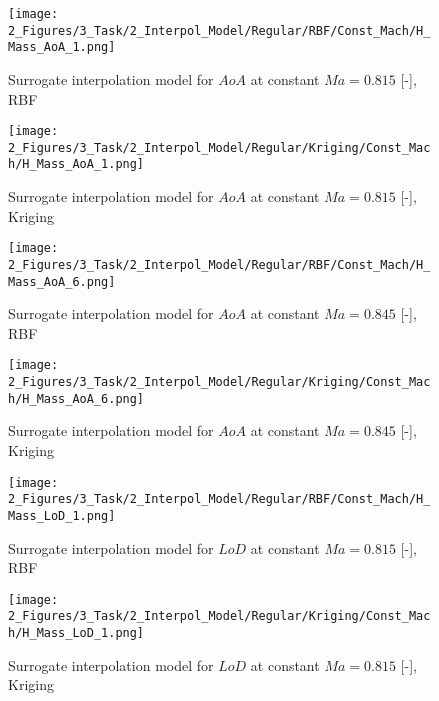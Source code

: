 \begin{figure}[!h]
    \begin{minipage}[h]{0.46\textwidth}
        \centering
        \texttt{[image: 2\_Figures/3\_Task/2\_Interpol\_Model/Regular/RBF/Const\_Mach/H\_Mass\_AoA\_1.png]}
        \caption{Surrogate interpolation model for $AoA$ at constant $Ma = 0.815$ [-], RBF}
        \label{fig_68}    
    \end{minipage}
    \hfill
    \begin{minipage}{0.46\textwidth}
        \centering
        \texttt{[image: 2\_Figures/3\_Task/2\_Interpol\_Model/Regular/Kriging/Const\_Mach/H\_Mass\_AoA\_1.png]}
        \caption{Surrogate interpolation model for $AoA$ at constant $Ma = 0.815$ [-], Kriging}
        \label{fig_69}    
    \end{minipage}
\end{figure} 

\begin{figure}[!h]
    \begin{minipage}[h]{0.46\textwidth}
        \centering
        \texttt{[image: 2\_Figures/3\_Task/2\_Interpol\_Model/Regular/RBF/Const\_Mach/H\_Mass\_AoA\_6.png]}
        \caption{Surrogate interpolation model for $AoA$ at constant $Ma = 0.845$ [-], RBF}
        \label{fig_70}    
    \end{minipage}
    \hfill
    \begin{minipage}{0.46\textwidth}
        \centering
        \texttt{[image: 2\_Figures/3\_Task/2\_Interpol\_Model/Regular/Kriging/Const\_Mach/H\_Mass\_AoA\_6.png]}
        \caption{Surrogate interpolation model for $AoA$ at constant $Ma = 0.845$ [-], Kriging}
        \label{fig_71}    
    \end{minipage}
\end{figure} 



\begin{figure}[!h]
    \begin{minipage}[h]{0.46\textwidth}
        \centering
        \texttt{[image: 2\_Figures/3\_Task/2\_Interpol\_Model/Regular/RBF/Const\_Mach/H\_Mass\_LoD\_1.png]}
        \caption{Surrogate interpolation model for $LoD$ at constant $Ma = 0.815$ [-], RBF}
        \label{fig_72}    
    \end{minipage}
    \hfill
    \begin{minipage}{0.46\textwidth}
        \centering
        \texttt{[image: 2\_Figures/3\_Task/2\_Interpol\_Model/Regular/Kriging/Const\_Mach/H\_Mass\_LoD\_1.png]}
        \caption{Surrogate interpolation model for $LoD$ at constant $Ma = 0.815$ [-], Kriging}
        \label{fig_73}    
    \end{minipage}
\end{figure} 

